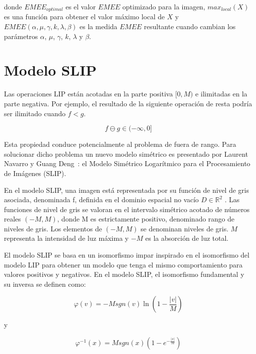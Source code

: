 donde $EMEE_{optimal}$ es el valor $EMEE$ optimizado para la imagen, $max_{local}(X)$ es una función para obtener el valor máximo local de $X$ y $EMEE(\alpha, \mu, \gamma, k, \lambda, \beta)$ es la medida $EMEE$ resultante cuando cambian los parámetros $\alpha$, $\mu$, $\gamma$, $k$, $\lambda$ y $\beta$.

\section{Modelo SLIP}

Las operaciones LIP están acotadas en la parte positiva $[0, M )$ e ilimitadas en la parte negativa. Por ejemplo, el resultado de la siguiente operación de resta podría ser ilimitado cuando $f < g$.

\begin{equation}
	f \ominus g \in (-\infty,0]
\end{equation}

Esta propiedad conduce potencialmente al problema de fuera de rango. Para solucionar dicho problema un nuevo modelo sim\'etrico es presentado por Laurent Navarro y Guang Deng~\cite{navarro2013symmetric}: el Modelo Sim\'etrico Logar\'itmico para el Procesamiento de Im\'agenes (SLIP). 

En el modelo SLIP, una imagen está representada por su función de nivel de gris asociada, denominada f, definida en el dominio espacial no vacío $D \in \mathbb{R}^2$ . Las funciones de nivel de gris se valoran en el intervalo simétrico acotado de números reales $(-M, M)$, donde M es estrictamente positivo, denominado rango de niveles de gris. Los elementos de $(-M, M )$ se denominan niveles de gris. $M$ representa la intensidad de luz máxima y $-M$ es la absorción de luz total.

El modelo SLIP se basa en un isomorfismo impar inspirado en el isomorfismo del modelo LIP para obtener un modelo que tenga el mismo comportamiento para valores positivos y negativos. En el modelo SLIP, el isomorfismo fundamental y su inversa se definen como:

\begin{equation}
	\varphi(v)=-Msgn(v)\ln\left(1-\frac{|v|}{M}\right)
\end{equation}

y

\begin{equation}
	\varphi^{-1}(x)=Msgn(x)\left(1-e^{-\frac{|x|}{M}}\right)
\end{equation}

